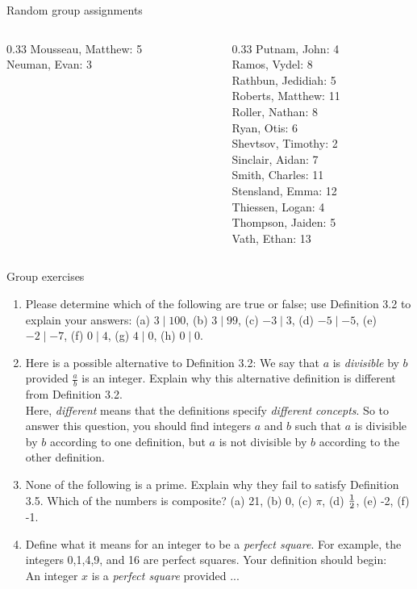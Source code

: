 \documentclass[10pt]{beamer}
\begin{document}
\begin{frame}{Random group assignments}
\begin{columns}
\begin{column}{0.33\textwidth}
Mousseau, Matthew: 5 \\ 
Neuman, Evan: 3 \\\end{column}
\begin{column}{0.33\textwidth}
Putnam, John: 4 \\ 
Ramos, Vydel: 8 \\ 
Rathbun, Jedidiah: 5 \\ 
Roberts, Matthew: 11 \\ 
Roller, Nathan: 8 \\ 
Ryan, Otis: 6 \\ 
Shevtsov, Timothy: 2 \\ 
Sinclair, Aidan: 7 \\ 
Smith, Charles: 11 \\ 
Stensland, Emma: 12 \\ 
Thiessen, Logan: 4 \\ 
Thompson, Jaiden: 5 \\ 
Vath, Ethan: 13 \\\end{column}
\end{columns}
\vfill
\end{frame}

\begin{frame}{Group exercises}
\begin{enumerate}
\item  Please determine which of the following are true or false; use Definition 3.2 to explain your answers: (a) $3 \mid 100$, (b) $3 \mid 99$, (c) $-3 \mid 3$, (d) $-5 \mid -5$, (e) $-2 \mid -7$, (f) $0 \mid 4$, (g) $4 \mid 0$, (h) $0 \mid 0$.
\item Here is a possible alternative to Definition 3.2: We say that $a$ is \textit{divisible} by $b$ provided $\frac{a}{b}$ is an integer.  Explain why this alternative definition is different from Definition 3.2.  \\
\hspace{0.5cm} Here, \textit{different} means that the definitions specify \textit{different concepts}.  So to answer this question, you should find integers $a$ and $b$ such that $a$ is divisible by $b$ according to one definition, but $a$ is not divisible by $b$ according to the other definition. 
\item None of the following is a prime.  Explain why they fail to satisfy Definition 3.5.  Which of the numbers is composite? (a) 21, (b) 0, (c) $\pi$, (d) $\frac{1}{2}$, (e) -2, (f) -1.  
\item Define what it means for an integer to be a \textit{perfect square}.  For example, the integers 0,1,4,9, and 16 are perfect squares.  Your definition should begin: \\
\hspace{0.5cm} An integer $x$ is a \textit{perfect square} provided ...
\end{enumerate}


\end{frame}
\end{document}
